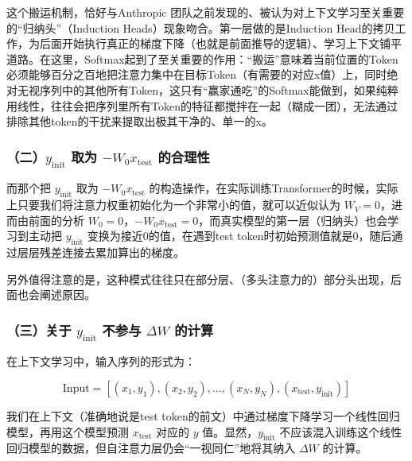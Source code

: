 这个搬运机制，恰好与Anthropic 团队之前发现的、被认为对上下文学习至关重要的``归纳头''（Induction Heads）现象吻合。第一层做的是Induction Head的拷贝工作，为后面开始执行真正的梯度下降（也就是前面推导的逻辑）、学习上下文铺平道路。在这里，Softmax起到了至关重要的作用：``搬运''意味着当前位置的Token必须能够百分之百地把注意力集中在目标Token（有需要的对应x值）上，同时绝对无视序列中的其他所有Token，这只有``赢家通吃''的Softmax能做到，如果纯粹用线性，往往会把序列里所有Token的特征都搅拌在一起（糊成一团），无法通过排除其他token的干扰来提取出极其干净的、单一的x。

\hypertarget{ux4e8cy_mathrminit-ux53d6ux4e3a--w_0x_mathrmtest-ux7684ux5408ux7406ux6027}{%
\subsubsection{\texorpdfstring{（二）\(y_{\mathrm{init}}\) 取为 \(-W_0x_{\mathrm{test}}\) 的合理性}{（二）y\_\{\textbackslash mathrm\{init\}\} 取为 -W\_0x\_\{\textbackslash mathrm\{test\}\} 的合理性}}\label{ux4e8cy_mathrminit-ux53d6ux4e3a--w_0x_mathrmtest-ux7684ux5408ux7406ux6027}}

而那个把 \(y_{\mathrm{init}}\) 取为 \(-W_0x_{\mathrm{test}}\) 的构造操作，在实际训练Transformer的时候，实际上只要我们将注意力权重初始化为一个非常小的值，就可以近似认为 \(W_V=0\)，进而由前面的分析 \(W_0=0\)，\(-W_0x_{\mathrm{test}}=0\)，而真实模型的第一层（归纳头）也会学习到主动把 \(y_{\mathrm{init}}\) 变换为接近0的值，在遇到test token时初始预测值就是0，随后通过层层残差连接去累加算出的梯度。

另外值得注意的是，这种模式往往只在部分层、（多头注意力的）部分头出现，后面也会阐述原因。

\hypertarget{ux4e09ux5173ux4e8e-y_mathrminit-ux4e0dux53c2ux4e0e-delta-w-ux7684ux8ba1ux7b97}{%
\subsubsection{\texorpdfstring{（三）关于 \(y_{\mathrm{init}}\) 不参与 \(\Delta W\) 的计算}{（三）关于 y\_\{\textbackslash mathrm\{init\}\} 不参与 \textbackslash Delta W 的计算}}\label{ux4e09ux5173ux4e8e-y_mathrminit-ux4e0dux53c2ux4e0e-delta-w-ux7684ux8ba1ux7b97}}

在上下文学习中，输入序列的形式为：

\[
\mathrm{Input}=[(x_1,y_1),(x_2,y_2),\ldots,(x_N,y_N),(x_{\mathrm{test}},y_{\mathrm{init}})]
\]

我们在上下文（准确地说是test token的前文）中通过梯度下降学习一个线性回归模型，再用这个模型预测 \(x_{\mathrm{test}}\) 对应的 \(y\) 值。显然，\(y_{\mathrm{init}}\) 不应该混入训练这个线性回归模型的数据，但自注意力层仍会``一视同仁''地将其纳入 \(\Delta W\) 的计算。

